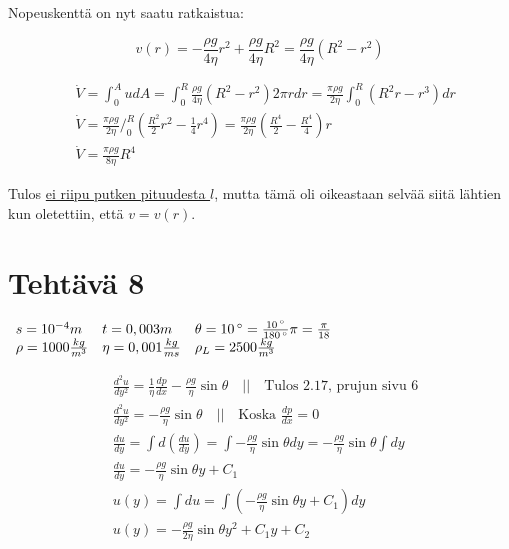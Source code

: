 \documentclass[12pt,a4paper,finnish]{article}
\begin{document}
Nopeuskenttä on nyt saatu ratkaistua:

\begin{equation}
 v(r) = -\frac{\rho g}{4\eta}r^2 + \frac{\rho g}{4\eta}R^2 = \frac{\rho g}{4\eta}(R^2 - r^2)
\end{equation}

\begin{align}
  &\dot{V} = \int_0^AudA = \int_0^R\frac{\rho g}{4\eta}(R^2 - r^2)2\pi rdr
   = \frac{\pi\rho g}{2\eta}\int_0^R(R^2r - r^3) dr\\
  &\dot{V} = \frac{\pi\rho g}{2\eta}\bigg/_0^R\left(\frac{R^2}{2}r^2 - \frac{1}{4}r^4\right)
   = \frac{\pi\rho g}{2\eta}\left(\frac{R^4}{2} - \frac{R^4}{4}\right)r\\
  &\dot{V} = \frac{\pi\rho g}{8\eta}R^4
\end{align}

Tulos \underline{ei riipu putken pituudesta $l$}, mutta tämä oli oikeastaan selvää siitä 
lähtien kun oletettiin, että $v = v(r)$.

\section{Tehtävä 8}

\begin{math}
 \begin{array}{l l l}
  s = 10^{-4}m & t = 0,003m & \theta = 10\,^{\circ} = \frac{10\,^{\circ}}{180\,^{\circ}}\pi = \frac{\pi}{18}\\
  \rho = 1000\frac{kg}{m^3} & \eta = 0,001\frac{kg}{ms} & \rho_L = 2500\frac{kg}{m^3}
 \end{array}
\end{math}

\begin{align}
 &\frac{d^2u}{dy^2} = \frac{1}{\eta}\frac{dp}{dx} -\frac{\rho g}{\eta}\sin\theta
  \quad \bigg|\bigg| \quad \text{Tulos 2.17, prujun sivu 6}\\
 &\frac{d^2u}{dy^2} = -\frac{\rho g}{\eta}\sin\theta \quad \bigg|\bigg| \quad \text{Koska } \frac{dp}{dx} = 0\\
 &\frac{du}{dy} = \int d\left(\frac{du}{dy}\right) = \int -\frac{\rho g}{\eta}\sin\theta dy
  = -\frac{\rho g}{\eta}\sin\theta\int dy\\
 &\frac{du}{dy} = -\frac{\rho g}{\eta}\sin\theta y + C_1\\
 &u(y) = \int du = \int \left(-\frac{\rho g}{\eta}\sin\theta y + C_1\right)dy\\
 &u(y) = -\frac{\rho g}{2\eta}\sin\theta y^2 + C_1y + C_2
\end{align}
\end{document}
